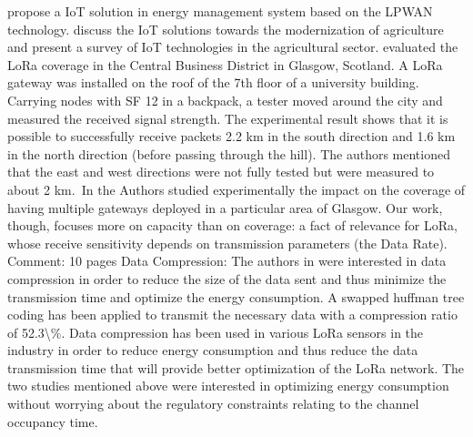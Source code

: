  \cite{song_internet_2017}   \citet{song_internet_2017} propose a IoT solution in energy management system based on the LPWAN technology.\citet{song_internet_2017}\cite{tzounis_internet_2017} discuss the IoT solutions towards the modernization of agriculture and present a survey of IoT technologies in the agricultural sector.   \newline 
 \cite{wixted_evaluation_2016}   \citet{wixted_evaluation_2016} evaluated the LoRa coverage in the Central Business District in Glasgow, Scotland. A LoRa gateway was installed on the roof of the 7th floor of a university building. Carrying nodes with SF 12 in a backpack, a tester moved around the city and measured the received signal strength. The experimental result shows that it is possible to successfully receive packets 2.2 km in the south direction and 1.6 km in the north direction (before passing through the hill). The authors mentioned that the east and west directions were not fully tested but were measured to about 2 km.~In \cite{wixted_evaluation_2016} the Authors studied experimentally the impact on the coverage of having multiple gateways deployed in a particular area of Glasgow. Our work, though, focuses more on capacity than on coverage: a fact of relevance for LoRa, whose receive sensitivity depends on transmission parameters (the Data Rate).   \newline 
 \cite{finnegan_comparative_2018}   Comment: 10 pages   \newline 
 \cite{jang_swapped_2016}   Data Compression: The authors in \cite{jang_swapped_2016} were interested in data compression in order to reduce the size of the data sent and thus minimize the transmission time and optimize the energy consumption. A swapped huffman tree coding has been applied to transmit the necessary data with a compression ratio of 52.3\textbackslash\%. Data compression has been used in various LoRa sensors in the industry \cite{LorawanSpecification} in order to reduce energy consumption and thus reduce the data transmission time that will provide better optimization of the LoRa network. The two studies mentioned above were interested in optimizing energy consumption without worrying about the regulatory constraints relating to the channel occupancy time.   \newline 
